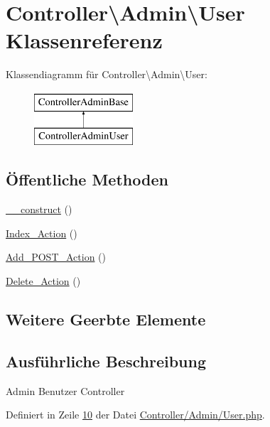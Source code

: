 \hypertarget{class_controller_1_1_admin_1_1_user}{\section{Controller\textbackslash{}Admin\textbackslash{}User Klassenreferenz}
\label{class_controller_1_1_admin_1_1_user}
}
Klassendiagramm für Controller\textbackslash{}Admin\textbackslash{}User\-:\begin{figure}[H]
\begin{center}
\leavevmode
\includegraphics[height=2.000000cm]{class_controller_1_1_admin_1_1_user}
\end{center}
\end{figure}
\subsection*{Öffentliche Methoden}
\begin{DoxyCompactItemize}
\item 
\hyperlink{class_controller_1_1_admin_1_1_user_acbbf0aeb45206f2d0c9e347e8a1d19c9}{\-\_\-\-\_\-construct} ()
\item 
\hyperlink{class_controller_1_1_admin_1_1_user_a006c1efe9d23f5307039c1beb0ce18a5}{Index\-\_\-\-Action} ()
\item 
\hyperlink{class_controller_1_1_admin_1_1_user_a381c8672d1cec6440138d0bf939fb5ec}{Add\-\_\-\-P\-O\-S\-T\-\_\-\-Action} ()
\item 
\hyperlink{class_controller_1_1_admin_1_1_user_a96952a534cf944ff774fdab36d8efaaa}{Delete\-\_\-\-Action} ()
\end{DoxyCompactItemize}
\subsection*{Weitere Geerbte Elemente}


\subsection{Ausführliche Beschreibung}
Admin Benutzer Controller 

Definiert in Zeile \hyperlink{_controller_2_admin_2_user_8php_source_l00010}{10} der Datei \hyperlink{_controller_2_admin_2_user_8php_source}{Controller/\-Admin/\-User.\-php}.



